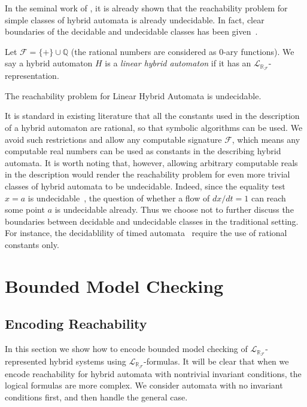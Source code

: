 \documentclass[envcountsect]{llncs}
\newcommand{\lrf}{\mathcal{L}_{\mathbb{R}_{\mathcal{F}}}}
\begin{document}
In the seminal work of \cite{DBLP:conf/rex/AlurD91,DBLP:conf/hybrid/AlurCHH92},
it is already shown that the reachability problem for simple classes of hybrid
automata is already undecidable. In fact, clear boundaries of the decidable and
undecidable classes has been given~\cite{DBLP:journals/jcss/HenzingerKPV98}.
\begin{definition}
Let $\mathcal{F} = \{+\}\cup \mathbb{Q}$ (the rational numbers are considered as
 0-ary functions). We say a hybrid automaton $H$ is a {\em linear hybrid
automaton} if it has an $\lrf$-representation.
\end{definition}

\begin{proposition}
The reachability problem for Linear Hybrid Automata is undecidable.
\end{proposition}
\begin{remark}
It is standard in existing literature that all the constants used in the
description of a hybrid automaton are rational, so that symbolic algorithms can
be used. We avoid such restrictions and allow any
computable signature $\mathcal{F}$, which means  any computable real numbers
can be used as constants in the describing hybrid automata. It is worth noting
that, however, allowing arbitrary computable reals in the description would
render the reachability problem for even more trivial classes of hybrid automata
to be undecidable. Indeed, since the equality test $x=a$ is undecidable~\cite{},
the question of whether a flow of $dx/dt = 1$ can reach some point $a$ is
undecidable already. Thus we choose not to further discuss the boundaries
between decidable and undecidable classes in the traditional setting. For
instance, the decidablility of timed automata~\cite{DBLP:conf/rex/AlurD91}
require the use of rational constants only.
\end{remark}

\section{Bounded Model Checking}

\subsection{Encoding Reachability}

In this section we show how to encode bounded model checking of
$\lrf$-represented hybrid systems using $\lrf$-formulas. It will be clear that
when we encode reachability for hybrid automata with nontrivial invariant
conditions, the logical formulas are more complex. We consider automata with no
invariant conditions first, and then handle the general case.
\vspace{-.4cm}
\end{document}
